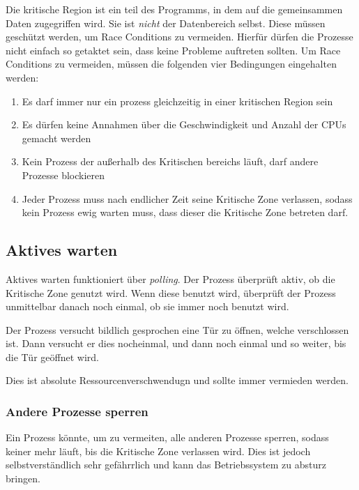 Die kritische Region ist ein teil des Programms, in dem auf die gemeinsammen
Daten zugegriffen wird. Sie ist \textit{nicht} der Datenbereich selbst. Diese
müssen geschützt werden, um Race Conditions zu vermeiden. Hierfür dürfen die
Prozesse nicht einfach so getaktet sein, dass keine Probleme auftreten sollten.
Um Race Conditions zu vermeiden, müssen die folgenden vier Bedingungen
eingehalten werden:

\begin{enumerate}
    \item Es darf immer nur ein prozess gleichzeitig in einer kritischen Region sein
    \item Es dürfen keine Annahmen über die Geschwindigkeit und Anzahl der CPUs gemacht
          werden
    \item Kein Prozess der außerhalb des Kritischen bereichs läuft, darf andere Prozesse
          blockieren
    \item Jeder Prozess muss nach endlicher Zeit seine Kritische Zone verlassen, sodass
          kein Prozess ewig warten muss, dass dieser die Kritische Zone betreten darf.
\end{enumerate}

\subsection{Aktives warten}
\label{aktives_warten}

Aktives warten funktioniert über \textit{polling}. Der Prozess überprüft aktiv,
ob die Kritische Zone genutzt wird. Wenn diese benutzt wird, überprüft der
Prozess unmittelbar danach noch einmal, ob sie immer noch benutzt wird.

Der Prozess versucht bildlich gesprochen eine Tür zu öffnen, welche
verschlossen ist. Dann versucht er dies nocheinmal, und dann noch einmal und so
weiter, bis die Tür geöffnet wird.

Dies ist absolute Ressourcenverschwendugn und sollte immer vermieden werden.

\subsubsection{Andere Prozesse sperren}

Ein Prozess könnte, um  zu vermeiten, alle anderen
Prozesse sperren, sodass keiner mehr läuft, bis die Kritische Zone verlassen
wird. Dies ist jedoch selbstverständlich sehr gefährrlich und kann das
Betriebssystem zu absturz bringen.

